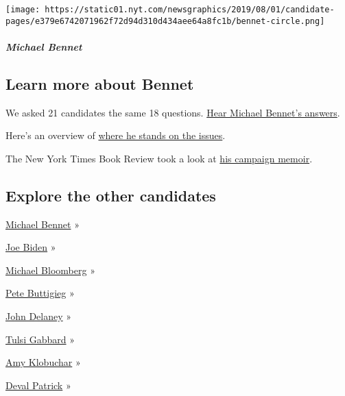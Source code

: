\texttt{[image: https://static01.nyt.com/newsgraphics/2019/08/01/candidate-pages/e379e6742071962f72d94d310d434aee64a8fc1b/bennet-circle.png]}

\hypertarget{michael-bennet-1}{%
\subparagraph{Michael Bennet}\label{michael-bennet-1}}

\hypertarget{learn-more-about-bennet}{%
\subsection{Learn more about Bennet}\label{learn-more-about-bennet}}

We asked 21 candidates the same 18 questions.
\href{https://www.nytimes.com/interactive/2019/us/politics/michael-bennet-2020-campaign.html}{Hear
Michael Bennet's answers}.

Here's an overview of
\href{https://www.nytimes.com/2019/05/02/us/politics/michael-bennet-issues-2020.html}{where
he stands on the issues}.

The New York Times Book Review took a look at
\href{https://www.nytimes.com/2019/06/24/books/review/michael-bennet-the-land-of-flickering-lights.html}{his
campaign memoir}.

\hypertarget{explore-the-other-candidates}{%
\subsection{Explore the other
candidates}\label{explore-the-other-candidates}}

\href{https://www.nytimes.com/interactive/2020/us/elections/michael-bennet.html}{Michael
Bennet} »

\href{https://www.nytimes.com/interactive/2020/us/elections/joe-biden.html}{Joe
Biden} »

\href{https://www.nytimes.com/interactive/2020/us/elections/michael-bloomberg.html}{Michael
Bloomberg} »

\href{https://www.nytimes.com/interactive/2020/us/elections/pete-buttigieg.html}{Pete
Buttigieg} »

\href{https://www.nytimes.com/interactive/2020/us/elections/john-delaney.html}{John
Delaney} »

\href{https://www.nytimes.com/interactive/2020/us/elections/tulsi-gabbard.html}{Tulsi
Gabbard} »

\href{https://www.nytimes.com/interactive/2020/us/elections/amy-klobuchar.html}{Amy
Klobuchar} »

\href{https://www.nytimes.com/interactive/2020/us/elections/deval-patrick.html}{Deval
Patrick} »

